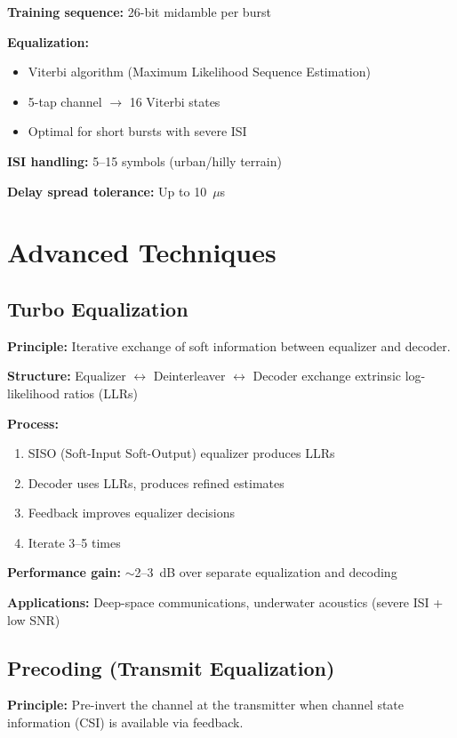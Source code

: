 \textbf{Training sequence:} 26-bit midamble per burst

\textbf{Equalization:}
\begin{itemize}
\item Viterbi algorithm (Maximum Likelihood Sequence Estimation)
\item 5-tap channel $\rightarrow$ 16 Viterbi states
\item Optimal for short bursts with severe ISI
\end{itemize}

\textbf{ISI handling:} 5--15 symbols (urban/hilly terrain)

\textbf{Delay spread tolerance:} Up to 10~$\mu$s

\section{Advanced Techniques}
\label{sec:advanced-techniques}

\subsection{Turbo Equalization}

\textbf{Principle:} Iterative exchange of soft information between equalizer and decoder.

\textbf{Structure:} Equalizer $\leftrightarrow$ Deinterleaver $\leftrightarrow$ Decoder exchange extrinsic log-likelihood ratios (LLRs)

\textbf{Process:}
\begin{enumerate}
\item SISO (Soft-Input Soft-Output) equalizer produces LLRs
\item Decoder uses LLRs, produces refined estimates
\item Feedback improves equalizer decisions
\item Iterate 3--5 times
\end{enumerate}

\textbf{Performance gain:} $\sim$2--3~dB over separate equalization and decoding

\textbf{Applications:} Deep-space communications, underwater acoustics (severe ISI + low SNR)

\subsection{Precoding (Transmit Equalization)}

\textbf{Principle:} Pre-invert the channel at the transmitter when channel state information (CSI) is available via feedback.

